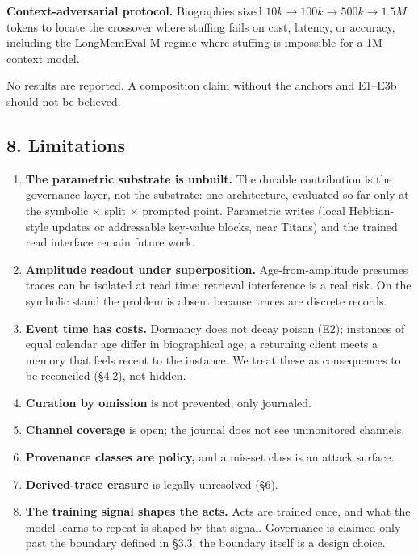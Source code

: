 \documentclass[
]{article}
\providecommand{\tightlist}{%
  \setlength{\itemsep}{0pt}\setlength{\parskip}{0pt}}
\begin{document}
\textbf{Context-adversarial protocol.} Biographies sized
\(10k \to 100k \to 500k \to 1.5M\) tokens to locate the crossover where
stuffing fails on cost, latency, or accuracy, including the
LongMemEval-M regime where stuffing is impossible for a 1M-context
model.

No results are reported. A composition claim without the anchors and
E1--E3b should not be believed.

\subsection{8. Limitations}\label{limitations}

\begin{enumerate}
\def\labelenumi{\arabic{enumi}.}
\tightlist
\item
  \textbf{The parametric substrate is unbuilt.} The durable contribution
  is the governance layer, not the substrate: one architecture,
  evaluated so far only at the symbolic × split × prompted point.
  Parametric writes (local Hebbian-style updates or addressable
  key-value blocks, near Titans) and the trained read interface remain
  future work.
\item
  \textbf{Amplitude readout under superposition.} Age-from-amplitude
  presumes traces can be isolated at read time; retrieval interference
  is a real risk. On the symbolic stand the problem is absent because
  traces are discrete records.
\item
  \textbf{Event time has costs.} Dormancy does not decay poison (E2);
  instances of equal calendar age differ in biographical age; a
  returning client meets a memory that feels recent to the instance. We
  treat these as consequences to be reconciled (§4.2), not hidden.
\item
  \textbf{Curation by omission} is not prevented, only journaled.
\item
  \textbf{Channel coverage} is open; the journal does not see
  unmonitored channels.
\item
  \textbf{Provenance classes are policy,} and a mis-set class is an
  attack surface.
\item
  \textbf{Derived-trace erasure} is legally unresolved (§6).
\item
  \textbf{The training signal shapes the acts.} Acts are trained once,
  and what the model learns to repeat is shaped by that signal.
  Governance is claimed only past the boundary defined in §3.3; the
  boundary itself is a design choice.
\end{enumerate}
\end{document}
